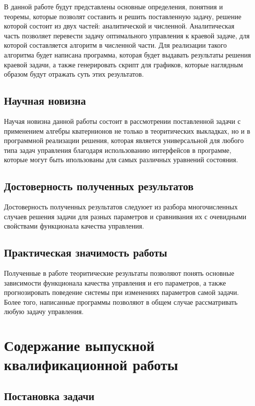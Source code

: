 \documentclass[14pt]{extreport}
\begin{document}
В данной работе будут представлены основные определения, понятния и теоремы, которые позволят составить и решить поставленную задачу,
решение которой состоит из двух частей: аналитической и численной. Аналитическая часть позволяет перевести задачу оптимального управления
к краевой задаче, для которой составляется алгоритм в численной части. Для реализации такого алгоритма будет написана программа,
которая будет выдавать результаты решения краевой задачи, а также генерировать скрипт для графиков, которые наглядным образом будут отражать
суть этих результатов.


\section{Научная новизна}

Научая новизна данной работы состоит в рассмотрении поставленной задачи с применением алгебры кватернионов не только в теоритических выкладках,
но и в программной реализации решения, которая является универсальной для любого типа задач управления благодаря использованию интерфейсов
в программе, которые могут быть ипользованы для самых различных уравнений состояния.

\section{Достоверность полученных результатов}

Достоверность полученных результатов следуюет из разбора многочисленных случаев решения задачи для разных параметров и сравнивания их
с очевидными свойствами функционала качества управления.

\section{Практическая значимость работы}

Полученные в работе теоритические результаты позволяют понять основные зависимости функционала качества управления и его параметров,
а также прогнозировать поведение системы при изменениях параметров самой задачи. Более того, написанные программы позволяют в общем случае рассматривать любую задачу управления.

\chapter{Содержание выпускной квалификационной работы}

\section{Постановка задачи}
\end{document}
